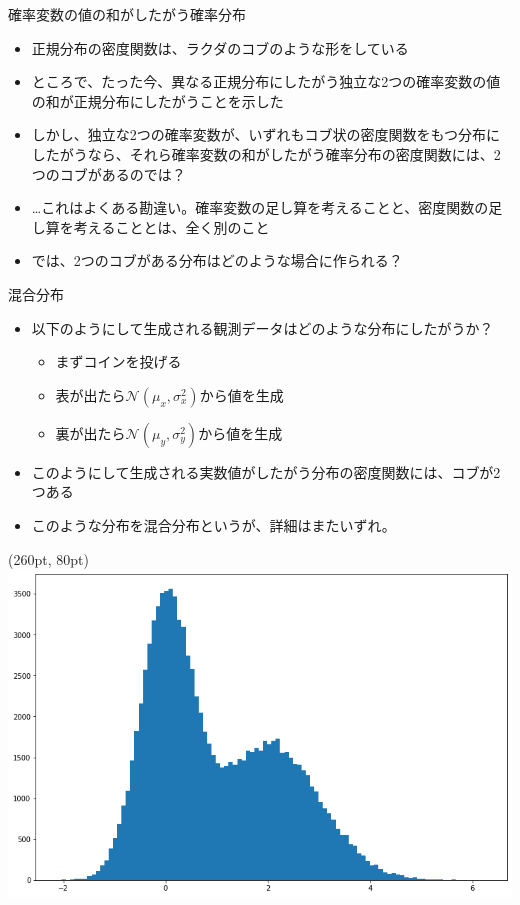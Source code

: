 \documentclass[aspectratio=169,unicode,dvipdfmx,14pt]{beamer}
\begin{document}
\begin{frame}{確率変数の値の和がしたがう確率分布}
\begin{itemize}
\item 正規分布の密度関数は、ラクダのコブのような形をしている
\item ところで、たった今、異なる正規分布にしたがう独立な2つの確率変数の値の和が正規分布にしたがうことを示した
\item しかし、独立な2つの確率変数が、いずれもコブ状の密度関数をもつ分布にしたがうなら、それら確率変数の和がしたがう確率分布の密度関数には、2つのコブがあるのでは？
\item …これはよくある勘違い。確率変数の足し算を考えることと、密度関数の足し算を考えることとは、全く別のこと
\item では、2つのコブがある分布はどのような場合に作られる？
\end{itemize}
\end{frame}

\begin{frame}{混合分布}
\begin{itemize}
\item 以下のようにして生成される観測データはどのような分布にしたがうか？
\begin{itemize}
\item まずコインを投げる
\item 表が出たら$\mathcal{N}(\mu_x,\sigma_x^2)$から値を生成
\item 裏が出たら$\mathcal{N}(\mu_y,\sigma_y^2)$から値を生成
\end{itemize}
\item このようにして生成される実数値がしたがう分布の密度関数には、コブが2つある
\item このような分布を混合分布というが、詳細はまたいずれ。
\end{itemize}
\begin{textblock*}{0.4\linewidth}(260pt, 80pt)
    \centering
    \includegraphics[width=0.7\linewidth]{./gaussian_mixture_1.png}
\end{textblock*}
\end{frame}
\end{document}
